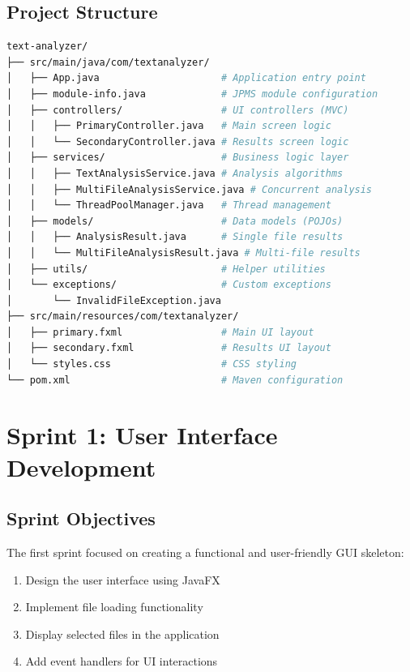 \documentclass[12pt,a4paper]{report}
\begin{document}
\section{Project Structure}
\begin{lstlisting}[language=bash, caption=Project Directory Structure]
text-analyzer/
├── src/main/java/com/textanalyzer/
│   ├── App.java                     # Application entry point
│   ├── module-info.java             # JPMS module configuration
│   ├── controllers/                 # UI controllers (MVC)
│   │   ├── PrimaryController.java   # Main screen logic
│   │   └── SecondaryController.java # Results screen logic
│   ├── services/                    # Business logic layer
│   │   ├── TextAnalysisService.java # Analysis algorithms
│   │   ├── MultiFileAnalysisService.java # Concurrent analysis
│   │   └── ThreadPoolManager.java   # Thread management
│   ├── models/                      # Data models (POJOs)
│   │   ├── AnalysisResult.java      # Single file results
│   │   └── MultiFileAnalysisResult.java # Multi-file results
│   ├── utils/                       # Helper utilities
│   └── exceptions/                  # Custom exceptions
│       └── InvalidFileException.java
├── src/main/resources/com/textanalyzer/
│   ├── primary.fxml                 # Main UI layout
│   ├── secondary.fxml               # Results UI layout
│   └── styles.css                   # CSS styling
└── pom.xml                          # Maven configuration
\end{lstlisting}

\chapter{Sprint 1: User Interface Development}

\section{Sprint Objectives}
The first sprint focused on creating a functional and user-friendly GUI skeleton:
\begin{enumerate}
    \item Design the user interface using JavaFX
    \item Implement file loading functionality
    \item Display selected files in the application
    \item Add event handlers for UI interactions
\end{enumerate}
\end{document}
